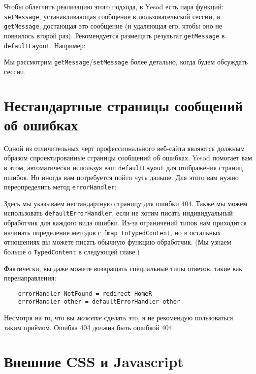 Чтобы облегчить реализацию этого подхода, в Yesod есть пара функций:
\lstinline!setMessage!, устанавливающая сообщение в пользовательской сессии, и
\lstinline!getMessage!, достающая это сообщение (и удаляющая его, чтобы оно не
появилось второй раз). Рекомендуется размещать результат \lstinline!getMessage!
в \lstinline!defaultLayout!. Например:


Мы рассмотрим \lstinline!getMessage!/\lstinline!setMessage! более детально,
когда будем обсуждать \hyperref[chap:sessions]{сессии}.

\section {Нестандартные страницы сообщений об ошибках}

Одной из отличительных черт профессионального веб-сайта являются должным
образом спроектированные страницы сообщений об ошибках. Yesod помогает вам в
этом, автоматически используя ваш \lstinline!defaultLayout! для отображения
страниц ошибок. Но иногда вам потребуется пойти чуть дальше. Для этого вам
нужно переопределить метод \lstinline!errorHandler!:


Здесь мы указываем нестандартную страницу для ошибки 404. Также мы можем
использовать \lstinline!defaultErrorHandler!, если не хотим писать
индивидуальный обработчик для каждого вида ошибки. Из-за ограничений типов нам
приходится начинать определение методов с \lstinline!fmap toTypedContent!, но в
остальных отношениях вы можете писать обычную функцию-обработчик. (Мы узнаем
больше о \lstinline!TypedContent! в следующей главе.)

Фактически, вы даже можете возвращать специальные типы ответов, такие как
перенаправления:

\begin{lstlisting}
    errorHandler NotFound = redirect HomeR
    errorHandler other = defaultErrorHandler other
\end{lstlisting}

\begin{remark}
    Несмотря на то, что вы \emph{можете} сделать это, я не рекомендую пользоваться
    таким приёмом. Ошибка 404 должна быть ошибкой 404.
\end{remark}

\section {Внешние CSS и Javascript}

